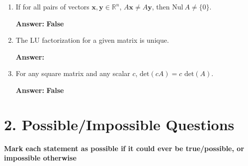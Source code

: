 \documentclass{article}
\begin{document}
\begin{enumerate}[label= 1.\arabic*,left=0pt]
    \item If for all pairs of vectors $\bm{x}, \bm{y} \in \mathbb{R}^n$, $A\bm{x} \neq A\bm{y}$, then $\text{Nul}~A \neq \{0\}$.
    
    \textbf{Answer:} \textbf{False}
    
    \item The LU factorization for a given matrix is unique.
    
    \textbf{Answer:} \underline{\hspace{1cm}}
    
    \item For any square matrix and any scalar $c$, $\text{det}(cA) = c\text{ det}(A)$.
    
    \textbf{Answer:} \textbf{False}
\end{enumerate}

\section*{2. Possible/Impossible Questions}

\textbf{Mark each statement as possible if it could ever be true/possible, or impossible otherwise}
\end{document}
